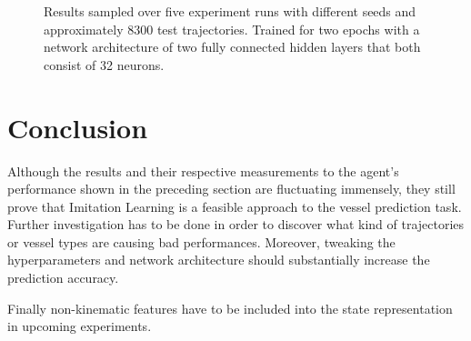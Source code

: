 \documentclass[conference]{IEEEtran}
\begin{document}
\begin{figure}[t]
\centering

\caption{Results sampled over five experiment runs with different seeds and approximately 8300 test trajectories. Trained for two epochs with a network architecture of two fully connected hidden layers that both consist of 32 neurons.}
\label{fig:result}
\end{figure}
\section{Conclusion}
Although the results and their respective measurements to the agent's performance shown in the preceding section are fluctuating immensely, they still prove that Imitation Learning is a feasible approach to the vessel prediction task. Further investigation has to be done in order to discover what kind of trajectories or vessel types are causing bad performances. Moreover, tweaking the hyperparameters and network architecture should substantially increase the prediction accuracy.
\par
Finally non-kinematic features have to be included into the state representation in upcoming experiments.



\end{document}

